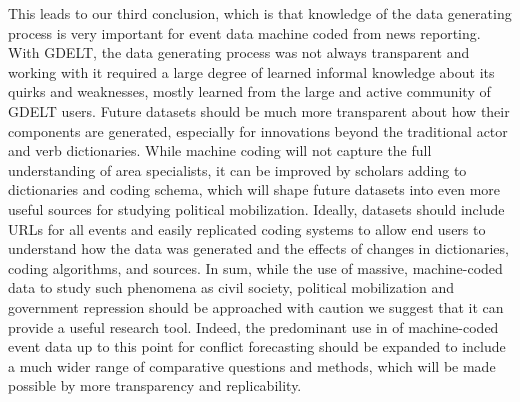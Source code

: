 \documentclass[10pt]{article}
\begin{document}
This leads to our third conclusion, which is that knowledge of the data generating process is very important for event data machine coded from news reporting. With GDELT, the data generating process was not always transparent and working with it required a large degree of learned informal knowledge about its quirks and weaknesses, mostly learned from the large and active community of GDELT users. Future datasets should be much more transparent about how their components are generated, especially for innovations beyond the traditional actor and verb dictionaries.  While machine coding will not capture the full understanding of area specialists, it can be improved by scholars adding to dictionaries and coding schema, which will shape future datasets into even more useful sources for studying political mobilization. Ideally, datasets should include URLs for all events and easily replicated coding systems to allow end users to understand how the data was generated and the effects of changes in dictionaries, coding algorithms, and sources.   In sum, while the use of massive, machine-coded data to study such phenomena as civil society, political mobilization and government repression should be approached with caution we suggest that it can provide a useful research tool.  Indeed, the predominant use in of machine-coded event data up to this point for conflict forecasting should be expanded to include a much wider range of comparative questions and methods, which will be made possible by more transparency and replicability.
 
\newpage


\end{document}
